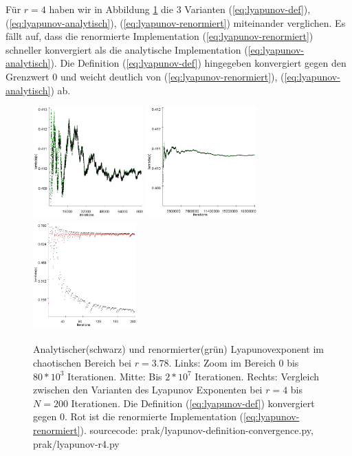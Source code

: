 \documentclass[11,5pt, twoside]{article}
\begin{document}
Für $r=4$ haben wir in Abbildung \ref{fig:lyapunov-chaos} die 3 Varianten (\ref{eq:lyapunov-def}), (\ref{eq:lyapunov-analytisch}), (\ref{eq:lyapunov-renormiert}) miteinander verglichen. Es fällt auf, dass die renormierte Implementation (\ref{eq:lyapunov-renormiert}) schneller konvergiert als die analytische Implementation (\ref{eq:lyapunov-analytisch}). 
Die Definition (\ref{eq:lyapunov-def}) hingegeben konvergiert gegen den Grenzwert 0 und weicht deutlich von (\ref{eq:lyapunov-renormiert}), (\ref{eq:lyapunov-analytisch}) ab.
\begin{figure}[!htbp]
\centering
\includegraphics[height=160px]{lya378-zoom}
\includegraphics[height=160px]{lya378}
\includegraphics[height=160px, width=150px]{lyapunov_r4}
\caption{Analytischer(schwarz) und renormierter(grün) Lyapunovexponent im chaotischen Bereich bei $r=3.78$. Links: Zoom im Bereich 0 bis $80*10^3$ Iterationen. Mitte: Bis $2*10^7$ Iterationen. Rechts: Vergleich zwischen den Varianten des Lyapunov Exponenten bei $r=4$ bis $N=200$ Iterationen. Die Definition (\ref{eq:lyapunov-def}) konvergiert gegen 0. Rot ist die renormierte Implementation (\ref{eq:lyapunov-renormiert}). sourcecode: prak/lyapunov-definition-convergence.py, prak/lyapunov-r4.py}
\label{fig:lyapunov-chaos}
\end{figure}
\end{document}
